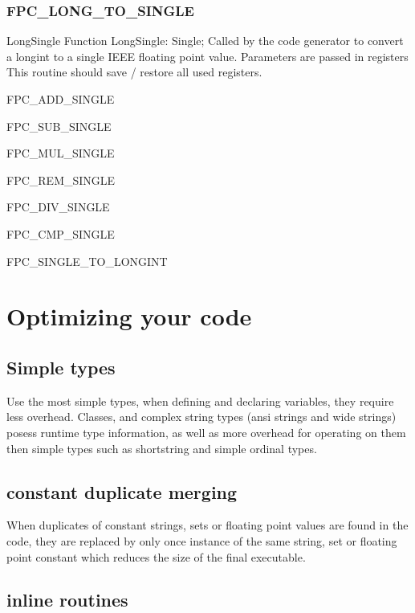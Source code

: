 \documentclass [12pt]{article}
\begin{document}
\subsubsection{FPC{\_}LONG{\_}TO{\_}SINGLE}
\label{subsubsec:mylabel109}

\begin{function}{LongSingle}
\Declaration
Function LongSingle: Single;
\Description
Called by the code generator to convert a longint to a single IEEE floating
point value.
\Parameters
Parameters are passed in registers 
\Notes 
This routine should save / restore all used registers. 
\end{function}

FPC{\_}ADD{\_}SINGLE

FPC{\_}SUB{\_}SINGLE

FPC{\_}MUL{\_}SINGLE

FPC{\_}REM{\_}SINGLE

FPC{\_}DIV{\_}SINGLE

FPC{\_}CMP{\_}SINGLE

FPC{\_}SINGLE{\_}TO{\_}LONGINT

\section{Optimizing your code}
\label{sec:optimizing}

\subsection{Simple types}
\label{subsec:simple}

Use the most simple types, when defining and declaring variables, they 
require less overhead. Classes, and complex string types (ansi strings and 
wide strings) posess runtime type information, as well as more overhead for 
operating on them then simple types such as shortstring and simple ordinal 
types.

\subsection{constant duplicate merging}
\label{subsec:constant}

When duplicates of constant strings, sets or floating point values are found 
in the code, they are replaced by only once instance of the same string, set 
or floating point constant which reduces the size of the final executable.

\subsection{inline routines}
\label{subsec:inline}
\end{document}
